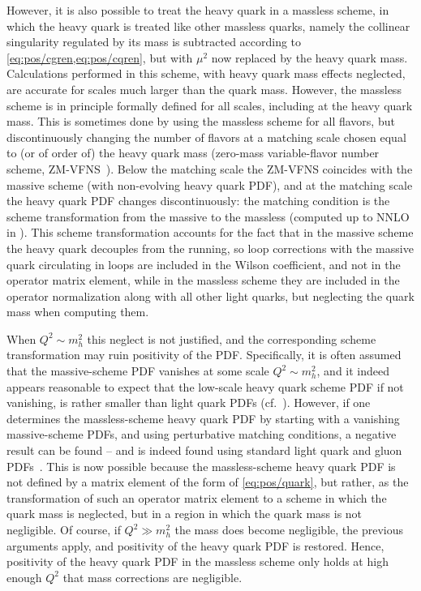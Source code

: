 However, it is also possible to treat the heavy quark in a massless \msbar{}
scheme, in which the heavy quark is treated like other massless
quarks, namely the collinear singularity regulated by its mass is
subtracted  according to \cref{eq:pos/cgren,eq:pos/cqren}, but with
$\mu^2$ now replaced by the heavy quark mass. Calculations performed
in this scheme, with heavy quark mass effects neglected, are accurate
for scales much larger than the quark mass.  
However,  the massless scheme is in principle formally defined for all scales,
including at the heavy quark mass. This is sometimes done by using the
massless scheme for all flavors, but discontinuously changing the
number of flavors at a matching scale chosen equal to (or of order of) the
heavy quark mass (zero-mass variable-flavor number scheme,
ZM-VFNS~\cite{Aivazis:1993pi}). Below the matching scale the ZM-VFNS
coincides with the massive scheme (with non-evolving heavy quark PDF),
and at the matching scale the heavy quark PDF
changes discontinuously:  the matching condition is the scheme transformation
from the massive to the massless \msbar{} (computed up to NNLO in
\cite{Buza:1996wv}). This scheme transformation accounts for the
fact that in the massive scheme the heavy quark decouples from the
running, so
loop corrections with the massive
quark circulating in loops are included in the Wilson coefficient,
and not in the operator matrix element, while in the massless scheme
they are included in the operator normalization along with all other
light quarks, but neglecting the quark mass when computing them.

When $Q^2\sim m_h^2$ this neglect is not justified, and the corresponding
scheme transformation may ruin positivity of the PDF. Specifically, it
is often assumed that the massive-scheme PDF vanishes at some scale  $Q^2\sim m_h^2$,
and it indeed appears
reasonable to expect that the low-scale heavy quark scheme PDF if not vanishing, is rather smaller than
light quark PDFs (cf.\
\cite{Ball:2015dpa,Ball:2016neh}). However, if one determines the 
massless-scheme
heavy quark PDF by starting with a vanishing massive-scheme PDFs, and
using perturbative  matching conditions, a negative result can be found
-- and is 
indeed found using standard light quark and gluon
PDFs~\cite{Ball:2017nwa}. This is now possible because the
massless-scheme heavy quark
PDF is not defined by a matrix element of the form of
\cref{eq:pos/quark}, but rather, as the transformation of such an
operator matrix element to a scheme in which the quark mass is
neglected, but in a region in which the quark mass is not negligible.
Of course, if  $Q^2\gg m_h^2$ the mass does become negligible, the
previous arguments apply, and
positivity of the heavy quark PDF is restored. Hence, positivity of
the heavy quark PDF in the massless scheme only holds at high enough
$Q^2$ that mass corrections are negligible.
 
